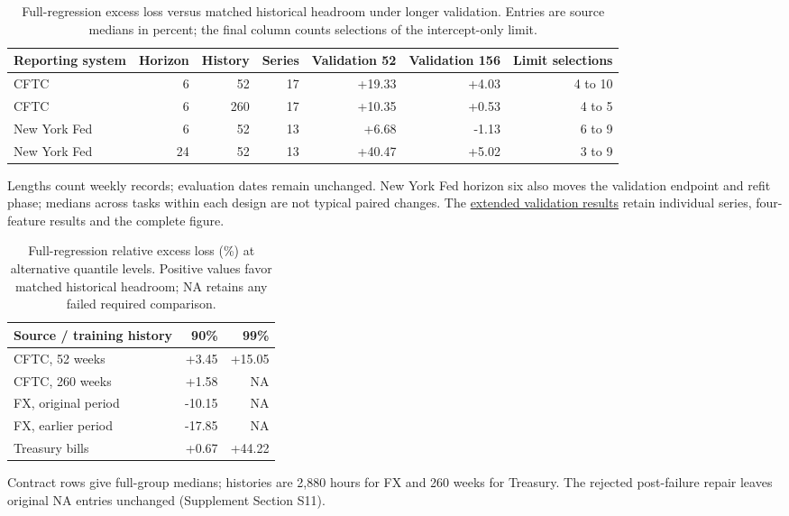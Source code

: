\documentclass[12pt,a4paper]{article}
\begin{document}
\clearpage
\begin{table}[p]\centering\small
\caption{Full-regression excess loss versus matched historical headroom under longer validation. Entries are source medians in percent; the final column counts selections of the intercept-only limit.}\label{tab:v13-validation}
\begin{tabular}{lrrrrrr}\toprule
Reporting system & Horizon & History & Series & Validation 52 & Validation 156 & Limit selections\\\midrule
CFTC & 6 & 52 & 17 & +19.33 & +4.03 & 4 to 10 \\
CFTC & 6 & 260 & 17 & +10.35 & +0.53 & 4 to 5 \\
New York Fed & 6 & 52 & 13 & +6.68 & -1.13 & 6 to 9 \\
New York Fed & 24 & 52 & 13 & +40.47 & +5.02 & 3 to 9 \\
\bottomrule\end{tabular}
\par\vspace{2pt}\begin{minipage}{.98\linewidth}\footnotesize
Lengths count weekly records; evaluation dates remain unchanged. New York Fed horizon six also moves the validation endpoint and refit phase; medians across tasks within each design are not typical paired changes.
The \href{https://github.com/ByronLi0207/financial-mathematics-paper-20261020/blob/submission-final/EXTENDED_RESULTS.md#asmbi-extended-s38}{extended validation results} retain individual series, four-feature results and the complete figure.
\end{minipage}\end{table}
\clearpage

\clearpage
\begin{table}[p]\centering\small
\caption{Full-regression relative excess loss (\%) at alternative quantile levels. Positive values favor matched historical headroom; NA retains any failed required comparison.}\label{tab:v12-tau}
\begin{tabular}{lrr}\toprule
Source / training history & 90\% & 99\% \\\midrule
CFTC, 52 weeks & +3.45 & +15.05 \\
CFTC, 260 weeks & +1.58 & \textsc{NA} \\
FX, original period & -10.15 & \textsc{NA} \\
FX, earlier period & -17.85 & \textsc{NA} \\
Treasury bills & +0.67 & +44.22 \\
\bottomrule\end{tabular}
\par\vspace{2pt}\begin{minipage}{.95\linewidth}\footnotesize
Contract rows give full-group medians; histories are 2,880 hours for FX and 260 weeks for Treasury.
The rejected post-failure repair leaves original NA entries unchanged (Supplement Section S11).
\end{minipage}\end{table}
\clearpage
\end{document}
